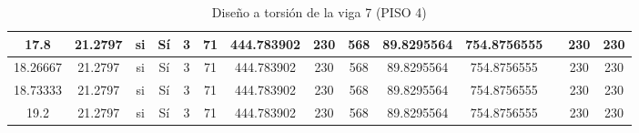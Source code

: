 \begin{table}[H]
{\begin{tabular}{|c|c|c|c|c|c|c|c|c|c|c|c|c|c|}
\hline
17.8 & 21.2797 & si  & Sí  & 3   & 71  & 444.783902 & 230 & 568 & 89.8295564 & 754.8756555 &     & 230 & 230 \bigstrut\\
\hline
18.26667 & 21.2797 & si  & Sí  & 3   & 71  & 444.783902 & 230 & 568 & 89.8295564 & 754.8756555 &     & 230 & 230 \bigstrut\\
\hline
18.73333 & 21.2797 & si  & Sí  & 3   & 71  & 444.783902 & 230 & 568 & 89.8295564 & 754.8756555 &     & 230 & 230 \bigstrut\\
\hline
19.2 & 21.2797 & si  & Sí  & 3   & 71  & 444.783902 & 230 & 568 & 89.8295564 & 754.8756555 &     & 230 & 230 \bigstrut\\
\hline
\end{tabular}%

  


  }
      \caption{Diseño a torsión de la viga 7 (PISO 4) }
  \label{tab:T VG7 P4 }%
\end{table}%

